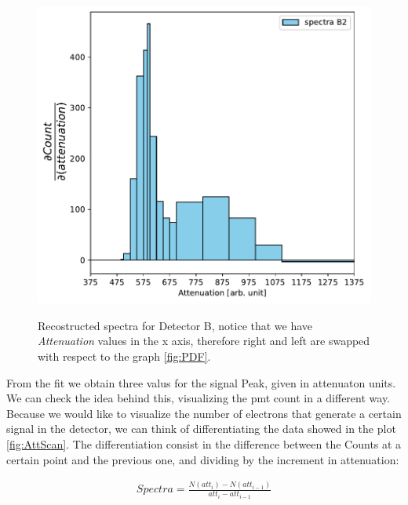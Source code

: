 \begin{figure}
{\includegraphics[scale = 0.5]{Analysis/CalibrationPMT/B2.pdf}}
\caption{Recostructed spectra for Detector B, notice that we have \textit{Attenuation} values in the x axis, therefore right and left are swapped with respect to the graph \ref{fig:PDF}.}
\end{figure}

From the fit we obtain three valus for the signal Peak, given in attenuaton units.
We can check the idea behind this, visualizing the pmt count in a different way. Because we would like to visualize the number of electrons that generate a certain signal in the detector, we can think of differentiating the data showed in the plot \ref{fig:AttScan}. The differentiation consist in the difference between the Counts at a certain point and the previous one, and dividing by the increment in attenuation:

\begin{align*}
Spectra = \frac{N(att_{i}) - N(att_{i-1})}{att_{i} - att_{i-1}} 
\end{align*}


